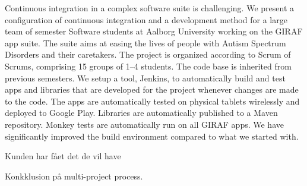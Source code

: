 Continuous integration in a complex software suite is challenging. We present a configuration of continuous integration and a development method for a large team of  semester Software students at Aalborg University working on the GIRAF app suite. The suite aims at easing the lives of people with Autism Spectrum Disorders and their caretakers. The project is organized according to Scrum of Scrums, comprising 15 groups of 1--4 students. The code base is inherited from previous semesters. We setup a tool, Jenkins, to automatically build and test apps and libraries that are developed for the project whenever changes are made to the code. The apps are automatically tested on physical tablets wirelessly and deployed to Google Play. Libraries are automatically published to a Maven repository. Monkey tests are automatically run on all GIRAF apps. We have significantly improved the build environment compared to what we started with.

Kunden har fået det de vil have

Konkklusion på multi-project process.